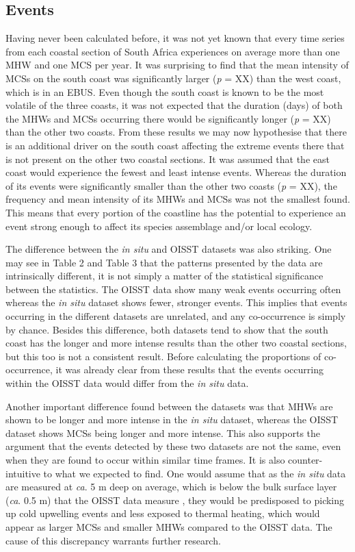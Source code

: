 \documentclass[a4paper,10pt,review]{elsarticle}
\begin{document}
\subsection{Events}
Having never been calculated before, it was not yet known that every time series from each coastal section of South Africa experiences on average more than one MHW and one MCS per year. It was surprising to find that the mean intensity of MCSs on the south coast was significantly larger (\emph{p} = XX) than the west coast, which is in an EBUS. Even though the south coast is known to be the most volatile of the three coasts, it was not expected that the duration (days) of both the MHWs and MCSs occurring there would be significantly longer (\emph{p} = XX) than the other two coasts. From these results we may now hypothesise that there is an additional driver on the south coast affecting the extreme events there that is not present on the other two coastal sections. It was assumed that the east coast would experience the fewest and least intense events. Whereas the duration of its events were significantly smaller than the other two coasts (\emph{p} = XX), the frequency and mean intensity of its MHWs and MCSs was not the smallest found. This means that every portion of the coastline has the potential to experience an event strong enough to affect its species assemblage and/or local ecology.

The difference between the \emph{in situ} and OISST datasets was also striking. One may see in Table 2 and Table 3 that the patterns presented by the data are intrinsically different, it is not simply a matter of the statistical significance between the statistics. The OISST data show many weak events occurring often whereas the \emph{in situ} dataset shows fewer, stronger events. This implies that events occurring in the different datasets are unrelated, and any co-occurrence is simply by chance. Besides this difference, both datasets tend to show that the south coast has the longer and more intense results than the other two coastal sections, but this too is not a consistent result. Before calculating the proportions of co-occurrence, it was already clear from these results that the events occurring within the OISST data would differ from the \emph{in situ} data.

Another important difference found between the datasets was that MHWs are shown to be longer and more intense in the \emph{in situ} dataset, whereas the OISST dataset shows MCSs being longer and more intense. This also supports the argument that the events detected by these two datasets are not the same, even when they are found to occur within similar time frames. It is also counter-intuitive to what we expected to find. One would assume that as the \emph{in situ} data are measured at \emph{ca}. 5 m deep on average, which is below the bulk surface layer (\emph{ca}. 0.5 m) that the OISST data measure \cite{Reynolds2002}, they would be predisposed to picking up cold upwelling events and less exposed to thermal heating, which would appear as larger MCSs and smaller MHWs compared to the OISST data. The cause of this discrepancy warrants further research.
\end{document}
